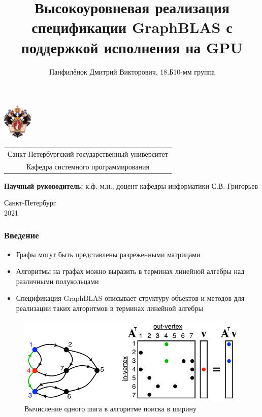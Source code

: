 \documentclass{beamer}
\title[GraphBLAS F\#]{Высокоуровневая реализация спецификации GraphBLAS с поддержкой исполнения на GPU}
\institute[СПбГУ]{}
\author[Панфилёнок Дмитрий]{Панфилёнок Дмитрий Викторович,  18.Б10-мм группа}
\begin{document}
{
\begin{frame}
  \includegraphics[width=1.4cm]{pictures/SPbGU_Logo.png}
\vspace{-35pt}
\hspace{-10pt}
\begin{center}
  \begin{tabular}{c}
    \scriptsize{Санкт-Петербургский государственный университет} \\
    \scriptsize{Кафедра системного программирования}
    \end{tabular}
\titlepage
\end{center}

\btVFill

{\scriptsize{\bfseries Научный руководитель:} к.ф.-м.н., доцент кафедры информатики С.В. Григорьев \\ }

\begin{center}
  \vspace{5pt}
  \scriptsize{Санкт-Петербург\\
                 2021}
  \end{center}
\end{frame}
}

\begin{frame}[fragile]  
  \frametitle{Введение}
  \begin{itemize}
  	\item Графы могут быть представлены разреженными матрицами
  	\item Алгоритмы на графах можно выразить в терминах линейной алгебры над различными полукольцами
    \item Спецификация GraphBLAS описывает структуру объектов и методов для реализации таких алгоритмов в терминах линейной алгебры
  \end{itemize}
  \begin{figure}
    \includegraphics[scale=0.35]{pictures/MatrixBFS.png}
    \caption{Вычисление одного шага в алгоритме поиска в ширину\footnotemark}
  \end{figure}
\end{frame}
     
\end{document}

